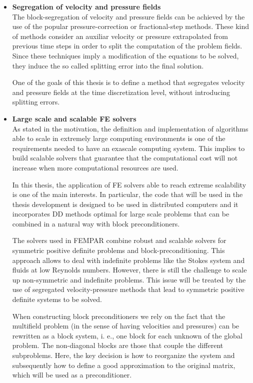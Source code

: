 \begin{itemize}
\item {\bf Segregation of velocity and pressure fields}\\
The block-segregation of velocity and pressure fields can be achieved by the use of the popular pressure-correction or fractional-step methods. These kind of methods consider an auxiliar velocity or pressure extrapolated from previous time steps in order to split the computation of the problem fields. Since these techniques imply a modification of the equations to be solved, they induce the so called splitting error into the final solution.

One of the goals of this thesis is to define a method that segregates velocity and pressure fields at the time discretization level, without introducing splitting errors.

\item {\bf Large scale and scalable FE solvers}\\
As stated in the motivation, the definition and implementation of algorithms able to scale in extremely large computing environments is one of the requirements needed to have an exascale computing system. This implies to build scalable solvers that guarantee that the computational cost will not increase when more computational resources are used.

In this thesis, the application of FE solvers able to reach extreme scalability is one of the main interests. In particular, the code that will be used in the thesis development is designed to be used in distributed computers and it incorporates DD methods optimal for large scale problems that can be combined in a natural way with block preconditioners.

The solvers used in FEMPAR combine robust and scalable solvers for symmetric positive definite problems and block-preconditioning. This approach allows to deal with indefinite problems like the Stokes system and fluids at low Reynolds numbers. However, there is still the challenge to scale up non-symmetric and indefinite problems. This issue will be treated by the use of segregated velocity-pressure methods that lead to symmetric positive definite systems to be solved.

When constructing block preconditioners we rely on the fact that the multifield problem (in the sense of having velocities and pressures) can be rewritten as a block system, i. e., one block for each unknown of the global problem. The non-diagonal blocks are those that couple the different subproblems. Here, the key decision is how to reorganize the system and subsequently how to define a good approximation to the original matrix, which will be used as a preconditioner.


\end{itemize}
